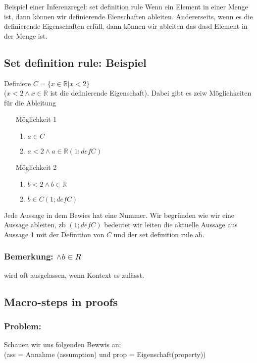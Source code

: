 {
    Beispiel einer Inferenzregel: set definition rule
}
{
    Wenn ein Element in einer Menge ist, dann können wir definierende Eienschaften ableiten. Andererseits, wenn es die definierende Eigenschaften erfüll, dann können wir ableiten das dasd Element in der Menge ist.
}

\subsection{Set definition rule: Beispiel} Definiere $C = \{x \in \mathbb{R}\vert x < 2\}$ \\ ($x < 2 \land x \in \mathbb{R}$ ist die definierende Eigenschaft). Dabei gibt es zeiw Möglichkeiten für die Ableitung 
\begin{itemize}
    \item [Möglichkeit 1] 
    \begin{enumerate}
        \item $a \in C$
        \item $a < 2 \land a \in \mathbb{R} (1; def C)$
    \end{enumerate}
    \item [Möglichkeit 2] 
    \begin{enumerate}
        \item $b < 2 \land b \in \mathbb{R} $
        \item $b \in C (1; def C)$
    \end{enumerate}
\end{itemize}
Jede Aussage in dem Bewies hat eine Nummer. Wir begründen wie wir eine Aussage ableiten, zb $(1; def C)$ bedeutet wir leiten die aktuelle Aussage aus Aussage 1 mit der Definition von $C$ und der set definition rule ab.

\subsubsection*{Bemerkung: $\land b \in R$} wird oft ausgelassen, wenn Kontext es zulässt.

\subsection{Macro-steps in proofs}
\subsubsection*{Problem: } Schauen wir uns folgenden Bewwis an: \\ (ass = Annahme (assumption) und prop = Eigenschaft(property))

